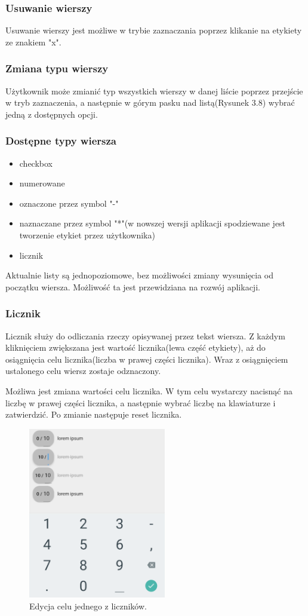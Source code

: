 \subsubsection{Usuwanie wierszy}

Usuwanie wierszy jest możliwe w trybie zaznaczania poprzez klikanie na etykiety ze znakiem "x".

\subsubsection{Zmiana typu wierszy}

Użytkownik może zmianić typ wszystkich wierszy w danej liście poprzez przejście w tryb zaznaczenia, a następnie w górym pasku nad listą(Rysunek 3.8) wybrać jedną z dostępnych opcji.

\subsubsection{Dostępne typy wiersza}

\begin{itemize}
    \item checkbox
    \item numerowane
    \item oznaczone przez symbol "\--{}"
    \item naznaczane przez symbol "*"(w nowszej wersji aplikacji spodziewane jest tworzenie etykiet przez użytkownika)
    \item licznik
\end{itemize}

Aktualnie listy są jednopoziomowe, bez możliwości zmiany wysunięcia od początku wiersza. Możliwość ta jest przewidziana na rozwój aplikacji.

\subsubsection{Licznik}

Licznik służy do odliczania rzeczy opisywanej przez tekst wiersza. Z każdym kliknięciem zwiększana jest wartość licznika(lewa część etykiety), aż do osiągnięcia celu licznika(liczba w prawej części licznika). Wraz z osiągnięciem ustalonego celu wiersz zostaje odznaczony.

Możliwa jest zmiana wartości celu licznika. W tym celu wystarczy nacisnąć na liczbę w prawej części licznika, a następnie wybrać liczbę na klawiaturze i zatwierdzić. Po zmianie następuje reset licznika.


\begin{figure}[ht]
    \centering
    \includegraphics[width=6cm]{images/liczniki.png}
    \caption{Edycja celu jednego z liczników.}
    \vspace{3mm}
\end{figure}